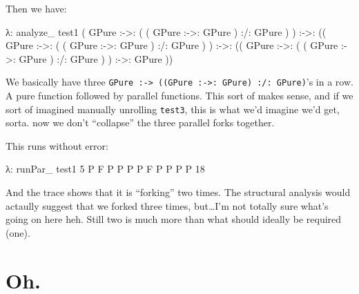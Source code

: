 \documentclass[]{article}
\newenvironment{Shaded}{}{}
\newcommand{\DataTypeTok}[1]{\textcolor[rgb]{0.56,0.13,0.00}{{#1}}}
\newcommand{\DecValTok}[1]{\textcolor[rgb]{0.25,0.63,0.44}{{#1}}}
\newcommand{\FunctionTok}[1]{\textcolor[rgb]{0.02,0.16,0.49}{{#1}}}
\newcommand{\NormalTok}[1]{{#1}}
\begin{document}
Then we have:

\begin{Shaded}
\begin{Highlighting}[]
\NormalTok{λ}\FunctionTok{:} \NormalTok{analyze_ test1}
\NormalTok{(}
  \DataTypeTok{GPure} \FunctionTok{:->:} \NormalTok{( ( }\DataTypeTok{GPure} \FunctionTok{:->:} \DataTypeTok{GPure} \NormalTok{) }\FunctionTok{:/:} \DataTypeTok{GPure} \NormalTok{)}
\NormalTok{) }\FunctionTok{:->:} \NormalTok{((}
  \DataTypeTok{GPure} \FunctionTok{:->:} \NormalTok{( ( }\DataTypeTok{GPure} \FunctionTok{:->:} \DataTypeTok{GPure} \NormalTok{) }\FunctionTok{:/:} \DataTypeTok{GPure} \NormalTok{)}
\NormalTok{) }\FunctionTok{:->:} \NormalTok{((}
  \DataTypeTok{GPure} \FunctionTok{:->:} \NormalTok{( ( }\DataTypeTok{GPure} \FunctionTok{:->:} \DataTypeTok{GPure} \NormalTok{) }\FunctionTok{:/:} \DataTypeTok{GPure} \NormalTok{)}
\NormalTok{) }\FunctionTok{:->:}
  \DataTypeTok{GPure}
\NormalTok{))}
\end{Highlighting}
\end{Shaded}

We basically have three
\texttt{GPure\ :-\textgreater{}\ ((GPure\ :-\textgreater{}:\ GPure)\ :/:\ GPure)}'s
in a row. A pure function followed by parallel functions. This sort of makes
sense, and if we sort of imagined manually unrolling \texttt{test3}, this is
what we'd imagine we'd get, sorta. now we don't ``collapse'' the three parallel
forks together.

This runs without error:

\begin{Shaded}
\begin{Highlighting}[]
\NormalTok{λ}\FunctionTok{:} \NormalTok{runPar_ test1 }\DecValTok{5}
\DataTypeTok{P}
\DataTypeTok{F}
\DataTypeTok{P}
\DataTypeTok{P}
\DataTypeTok{P}
\DataTypeTok{P}
\DataTypeTok{F}
\DataTypeTok{P}
\DataTypeTok{P}
\DataTypeTok{P}
\DataTypeTok{P}
\DecValTok{18}
\end{Highlighting}
\end{Shaded}

And the trace shows that it is ``forking'' two times. The structural analysis
would actaully suggest that we forked three times, but\ldots{}I'm not totally
sure what's going on here heh. Still two is much more than what should ideally
be required (one).

\section{Oh.}\label{oh.}
\end{document}
